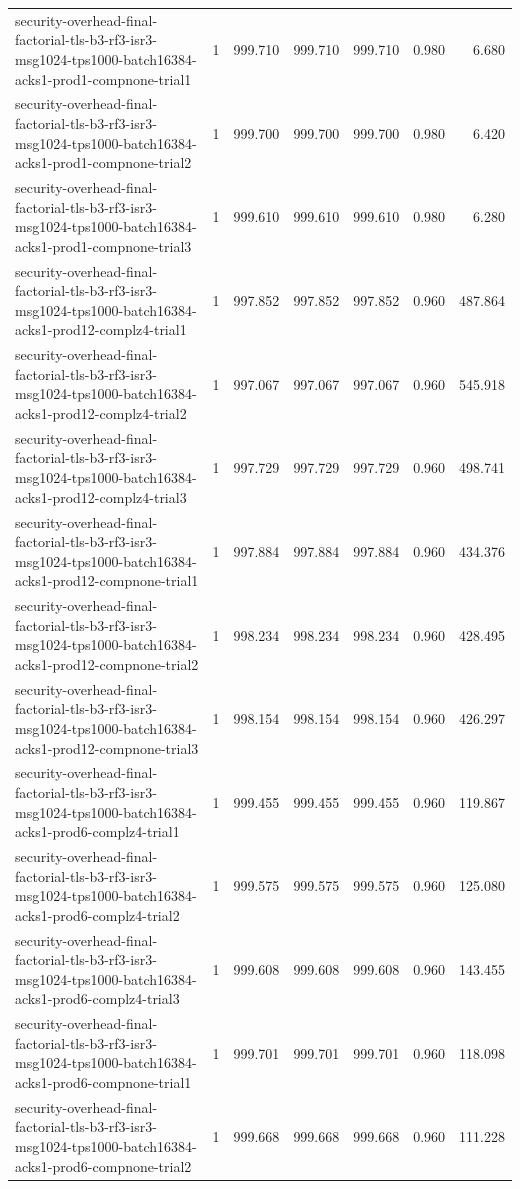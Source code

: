 \begin{tabular}{lrrrrrr}
security-overhead-final-factorial-tls-b3-rf3-isr3-msg1024-tps1000-batch16384-acks1-prod1-compnone-trial1 & 1 & 999.710 & 999.710 & 999.710 & 0.980 & 6.680 \\
security-overhead-final-factorial-tls-b3-rf3-isr3-msg1024-tps1000-batch16384-acks1-prod1-compnone-trial2 & 1 & 999.700 & 999.700 & 999.700 & 0.980 & 6.420 \\
security-overhead-final-factorial-tls-b3-rf3-isr3-msg1024-tps1000-batch16384-acks1-prod1-compnone-trial3 & 1 & 999.610 & 999.610 & 999.610 & 0.980 & 6.280 \\
security-overhead-final-factorial-tls-b3-rf3-isr3-msg1024-tps1000-batch16384-acks1-prod12-complz4-trial1 & 1 & 997.852 & 997.852 & 997.852 & 0.960 & 487.864 \\
security-overhead-final-factorial-tls-b3-rf3-isr3-msg1024-tps1000-batch16384-acks1-prod12-complz4-trial2 & 1 & 997.067 & 997.067 & 997.067 & 0.960 & 545.918 \\
security-overhead-final-factorial-tls-b3-rf3-isr3-msg1024-tps1000-batch16384-acks1-prod12-complz4-trial3 & 1 & 997.729 & 997.729 & 997.729 & 0.960 & 498.741 \\
security-overhead-final-factorial-tls-b3-rf3-isr3-msg1024-tps1000-batch16384-acks1-prod12-compnone-trial1 & 1 & 997.884 & 997.884 & 997.884 & 0.960 & 434.376 \\
security-overhead-final-factorial-tls-b3-rf3-isr3-msg1024-tps1000-batch16384-acks1-prod12-compnone-trial2 & 1 & 998.234 & 998.234 & 998.234 & 0.960 & 428.495 \\
security-overhead-final-factorial-tls-b3-rf3-isr3-msg1024-tps1000-batch16384-acks1-prod12-compnone-trial3 & 1 & 998.154 & 998.154 & 998.154 & 0.960 & 426.297 \\
security-overhead-final-factorial-tls-b3-rf3-isr3-msg1024-tps1000-batch16384-acks1-prod6-complz4-trial1 & 1 & 999.455 & 999.455 & 999.455 & 0.960 & 119.867 \\
security-overhead-final-factorial-tls-b3-rf3-isr3-msg1024-tps1000-batch16384-acks1-prod6-complz4-trial2 & 1 & 999.575 & 999.575 & 999.575 & 0.960 & 125.080 \\
security-overhead-final-factorial-tls-b3-rf3-isr3-msg1024-tps1000-batch16384-acks1-prod6-complz4-trial3 & 1 & 999.608 & 999.608 & 999.608 & 0.960 & 143.455 \\
security-overhead-final-factorial-tls-b3-rf3-isr3-msg1024-tps1000-batch16384-acks1-prod6-compnone-trial1 & 1 & 999.701 & 999.701 & 999.701 & 0.960 & 118.098 \\
security-overhead-final-factorial-tls-b3-rf3-isr3-msg1024-tps1000-batch16384-acks1-prod6-compnone-trial2 & 1 & 999.668 & 999.668 & 999.668 & 0.960 & 111.228 \\

\end{tabular}

